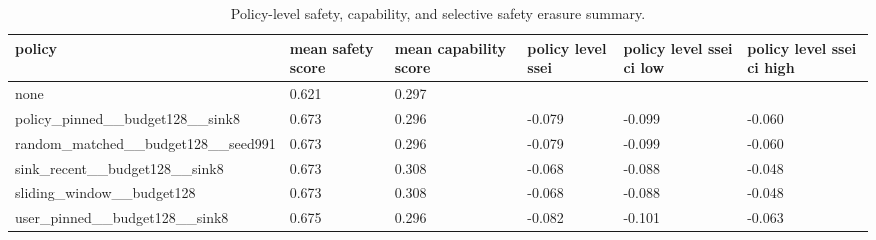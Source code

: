 \begin{table}[t]
\centering
\small
\setlength{\tabcolsep}{3pt}
\begin{tabularx}{\linewidth}{@{}lXXXXX@{}}
\toprule
policy & mean safety score & mean capability score & policy level ssei & policy level ssei ci low & policy level ssei ci high \\
\midrule
none & 0.621 & 0.297 &  &  &  \\
policy\_pinned\_\_budget128\_\_sink8 & 0.673 & 0.296 & -0.079 & -0.099 & -0.060 \\
random\_matched\_\_budget128\_\_seed991 & 0.673 & 0.296 & -0.079 & -0.099 & -0.060 \\
sink\_recent\_\_budget128\_\_sink8 & 0.673 & 0.308 & -0.068 & -0.088 & -0.048 \\
sliding\_window\_\_budget128 & 0.673 & 0.308 & -0.068 & -0.088 & -0.048 \\
user\_pinned\_\_budget128\_\_sink8 & 0.675 & 0.296 & -0.082 & -0.101 & -0.063 \\
\bottomrule
\end{tabularx}
\caption{Policy-level safety, capability, and selective safety erasure summary.}
\label{tab:main-results}
\end{table}
